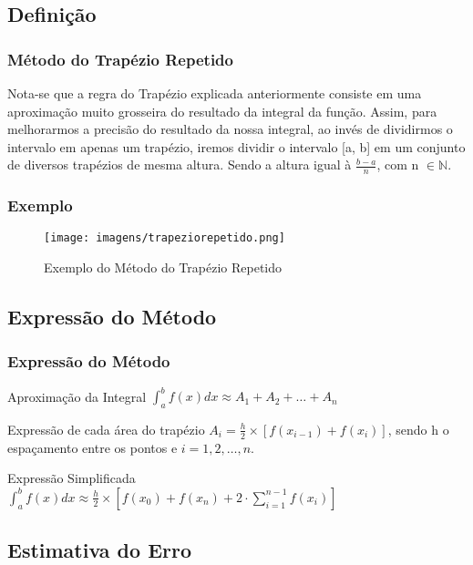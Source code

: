 \documentclass{beamer}
\begin{document}
\subsection{Definição}
\begin{frame}
\frametitle{Método do Trapézio Repetido}
	Nota-se que a regra do Trapézio explicada anteriormente consiste em uma aproximação muito grosseira do resultado da integral da função. Assim, para melhorarmos a precisão do resultado da nossa integral, ao invés de dividirmos o intervalo em apenas um trapézio, iremos dividir o intervalo [a, b] em um conjunto de diversos trapézios de mesma altura. Sendo a altura igual à $\frac{b-a}{n}$, com n $\in \mathbb{N}$.	
\end{frame}

\begin{frame}
\frametitle{Exemplo}
	\begin{figure}
		\caption{Exemplo do Método do Trapézio Repetido}
		\texttt{[image: imagens/trapeziorepetido.png]}
	\end{figure}	
\end{frame}

\subsection{Expressão do Método}
\begin{frame}
\frametitle{Expressão do Método}
\begin{block}{Aproximação da Integral}
$\int_{a}^{b}f\left(x\right)dx \approx A_1 + A_2 + \dots + A_n$ 
\end{block}

\begin{block}{Expressão de cada área do trapézio}
$A_i = \frac{h}{2} \times \left[f\left(x_{i-1}\right) + f\left(x_{i}\right) \right]$, sendo h o espaçamento entre os pontos e $i=1,2,\dots , n$.
\end{block}

\begin{block}{Expressão Simplificada}
$\int_{a}^{b}f\left(x\right)dx \approx \frac{h}{2} \times \left[ f\left(x_0\right) + f\left(x_n\right) + 2\cdot\sum_{i=1}^{n-1} f\left(x_i\right)\right]$
\end{block}
\end{frame}

\subsection{Estimativa do Erro}
\end{document}
